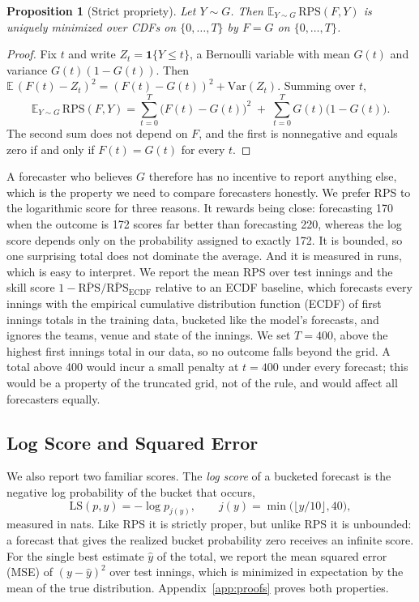 \documentclass{article}
\newtheorem{proposition}{Proposition}
\newcommand{\1}{\mathbf{1}}
\newcommand{\E}{\mathbb{E}}
\newcommand{\RPS}{\mathrm{RPS}}
\begin{document}
\begin{proposition}[Strict propriety]
Let $Y \sim G$. Then $\E_{Y \sim G}\,\RPS(F, Y)$ is uniquely minimized over CDFs on $\{0, \dots, T\}$ by $F = G$ on $\{0, \dots, T\}$.
\end{proposition}
\begin{proof}
Fix $t$ and write $Z_t = \1\{Y \le t\}$, a Bernoulli variable with mean $G(t)$ and variance $G(t)(1 - G(t))$. Then $\E\,(F(t) - Z_t)^2 = (F(t) - G(t))^2 + \mathrm{Var}(Z_t)$. Summing over $t$,
\begin{equation}\label{eq:decomp}
\E_{Y \sim G}\,\RPS(F, Y) = \sum_{t=0}^{T} \big(F(t) - G(t)\big)^2 \;+\; \sum_{t=0}^{T} G(t)\big(1 - G(t)\big).
\end{equation}
The second sum does not depend on $F$, and the first is nonnegative and equals zero if and only if $F(t) = G(t)$ for every $t$.
\end{proof}

A forecaster who believes $G$ therefore has no incentive to report anything else, which is the property we need to compare forecasters honestly. We prefer RPS to the logarithmic score for three reasons. It rewards being close: forecasting 170 when the outcome is 172 scores far better than forecasting 220, whereas the log score depends only on the probability assigned to exactly 172. It is bounded, so one surprising total does not dominate the average. And it is measured in runs, which is easy to interpret. We report the mean RPS over test innings and the skill score $1 - \overline{\RPS} / \overline{\RPS}_{\text{ECDF}}$ relative to an ECDF baseline, which forecasts every innings with the empirical cumulative distribution function (ECDF) of first innings totals in the training data, bucketed like the model's forecasts, and ignores the teams, venue and state of the innings. We set $T = 400$, above the highest first innings total in our data, so no outcome falls beyond the grid. A total above 400 would incur a small penalty at $t = 400$ under every forecast; this would be a property of the truncated grid, not of the rule, and would affect all forecasters equally.

\subsection{Log Score and Squared Error}\label{sec:otherscores}
We also report two familiar scores. The \emph{log score} \citep{gneiting2007} of a bucketed forecast is the negative log probability of the bucket that occurs,
\begin{equation}\label{eq:log}
\mathrm{LS}(p, y) = -\log p_{j(y)}, \qquad j(y) = \min\big(\lfloor y/10 \rfloor, 40\big),
\end{equation}
measured in nats. Like RPS it is strictly proper, but unlike RPS it is unbounded: a forecast that gives the realized bucket probability zero receives an infinite score. For the single best estimate $\hat y$ of the total, we report the mean squared error (MSE) of $(y - \hat y)^2$ over test innings, which is minimized in expectation by the mean of the true distribution. Appendix~\ref{app:proofs} proves both properties.
\end{document}
